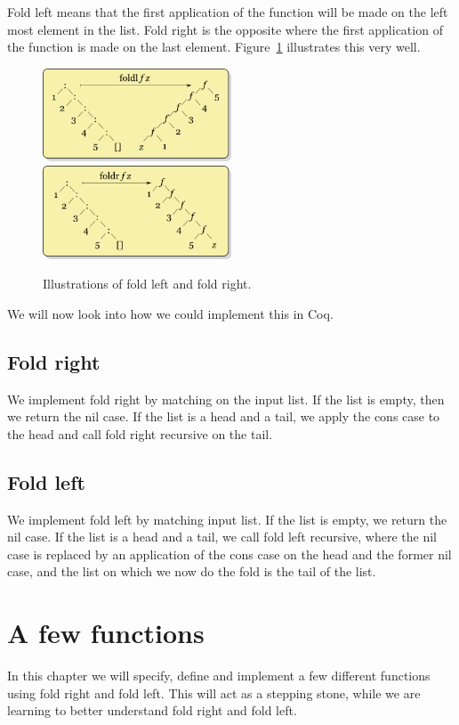 \documentclass[a4paper]{article}
\begin{document}
Fold left means that the first application of the function will be made on the
left most element in the list. Fold right is the opposite where the first
application of the function is made on the last element. Figure~\ref{fig:folds}
illustrates this very well.

\begin{figure}[h]
\includegraphics[width=0.5\textwidth]{fold_left}
\includegraphics[width=0.5\textwidth]{fold_right}
\caption{Illustrations of fold left and fold right.~\cite{foldl}\cite{foldr}}
\label{fig:folds}
\end{figure}

We will now look into how we could implement this in Coq.

\subsection{Fold right} 
We implement fold right by matching on the input list. If the list is empty,
then we return the nil case. If the list is a head and a tail, we apply the cons
case to the head and call fold right recursive on the tail.

\subsection{Fold left}
We implement fold left by matching input list. If the list is empty, we
return the nil case. If the list is a head and a tail, we call fold left
recursive, where the nil case is replaced by an application of the cons case on
the head and the former nil case, and the list on which we now do the fold is
the tail of the list.

\section{A few functions}
In this chapter we will specify, define and implement a few different functions
using fold right and fold left. This will act as a stepping stone, while we are
learning to better understand fold right and fold left.
\end{document}
